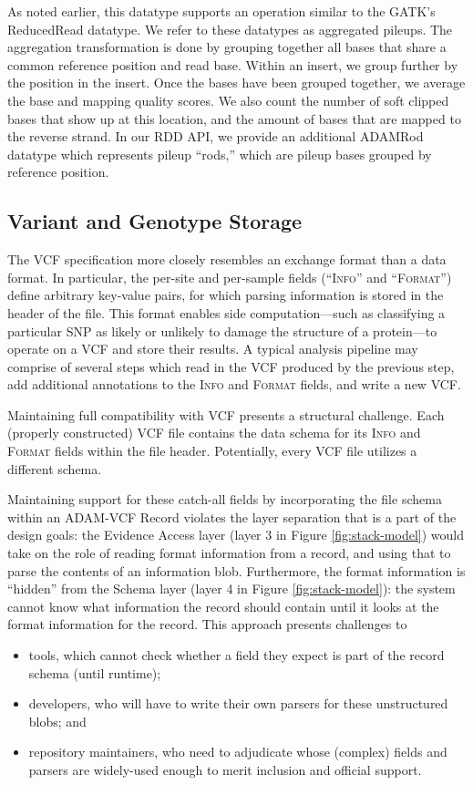 \documentclass[10pt,twocolumn]{article}
\theoremstyle{plain}
\begin{document}
As noted earlier, this datatype supports an operation similar to the GATK's ReducedRead datatype. We refer to these datatypes
as aggregated pileups. The aggregation transformation is done by grouping together all bases that share a common reference position and
read base. Within an insert, we group further by the position in the insert. Once the bases have been grouped together, we average
the base and mapping quality scores. We also count the number of soft clipped bases that show up at this location, and the amount
of bases that are mapped to the reverse strand. In our RDD API, we provide an additional ADAMRod datatype which represents
pileup ``rods,'' which are pileup bases grouped by reference position.

\subsection{Variant and Genotype Storage}
\label{sec:variant-and-genotype-storage}

The VCF specification more closely resembles an exchange format than a data format. In particular, the per-site and per-sample fields
(``\textsc{Info}'' and ``\textsc{Format}'') define arbitrary key-value pairs, for which parsing information is stored in the header of the file.
This format enables side computation---such as classifying a particular SNP as likely or unlikely to damage the structure of a protein---to operate on a VCF
and store their results. A typical analysis pipeline may comprise of several steps which read in the VCF produced by the previous step, add
additional annotations to the \textsc{Info} and \textsc{Format} fields, and write a new VCF.

Maintaining full compatibility with VCF presents a structural challenge. Each (properly constructed) VCF file contains the data schema for
its \textsc{Info} and \textsc{Format} fields within the file header. Potentially, every VCF file utilizes a different schema. 

Maintaining support
for these catch-all fields by incorporating the file schema within an ADAM-VCF Record violates the layer separation that is a part of the design
goals: the Evidence Access layer (layer 3 in Figure \ref{fig:stack-model}) would take on the role of reading format information from a record, and using that to parse the contents of an
information blob. Furthermore, the format information is ``hidden'' from the Schema layer (layer 4 in Figure \ref{fig:stack-model}): the system cannot know what information the record
should contain until it looks at the format information for the record. This approach presents challenges to
 \begin{itemize}
      \item tools, which cannot check whether a field they
expect is part of the record schema (until runtime); 
      \item developers, who will have to write their own parsers for these unstructured blobs; and 
      \item repository maintainers, who need to adjudicate whose (complex) fields and parsers are widely-used enough to merit inclusion and official support.
\end{itemize}
\end{document}

